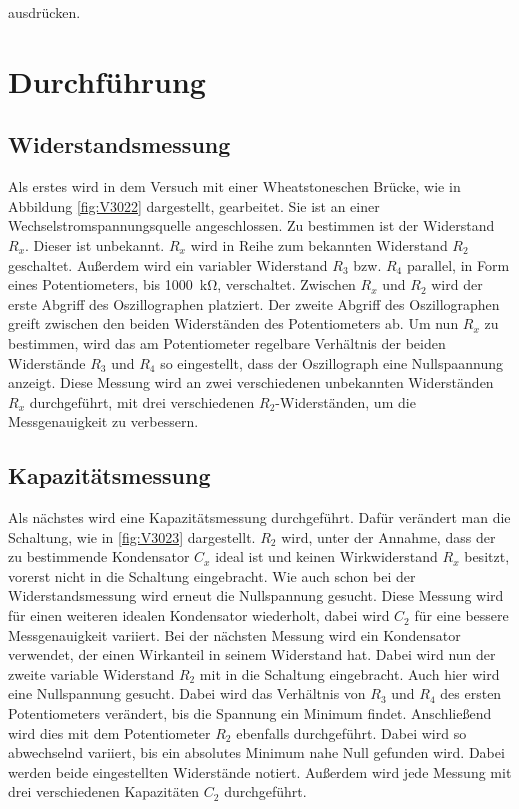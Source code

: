 \documentclass[
  bibliography=totoc,     %
  captions=tableheading,  %
  titlepage=firstiscover, %
]{scrartcl}
\begin{document}
ausdrücken.
\newpage
\section{Durchführung}
\label{sec:durchführung}
\subsection{Widerstandsmessung}
Als erstes wird in dem Versuch mit einer Wheatstoneschen Brücke, wie in
Abbildung \ref{fig:V3022} dargestellt, gearbeitet. Sie ist an einer
Wechselstromspannungsquelle angeschlossen. Zu bestimmen ist der Widerstand $R_x$.
Dieser ist unbekannt. $R_x$ wird in Reihe zum bekannten Widerstand $R_2$
geschaltet. Außerdem wird ein variabler Widerstand $R_3$ bzw. $R_4$ parallel,
in Form eines Potentiometers, bis \SI{1000}{\kilo\ohm}, verschaltet. Zwischen
$R_x$ und $R_2$ wird der erste Abgriff des Oszillographen platziert. Der zweite
Abgriff des Oszillographen greift zwischen den beiden Widerständen des
Potentiometers ab. Um nun $R_x$ zu bestimmen, wird das am Potentiometer
regelbare Verhältnis der beiden Widerstände $R_3$ und $R_4$ so eingestellt, dass
der Oszillograph eine Nullspaannung anzeigt. Diese Messung wird an zwei
verschiedenen unbekannten Widerständen $R_x$ durchgeführt, mit drei verschiedenen
$R_2$-Widerständen, um die Messgenauigkeit zu verbessern.
\subsection{Kapazitätsmessung}
Als nächstes wird eine Kapazitätsmessung durchgeführt. Dafür verändert man die
Schaltung, wie in \ref{fig:V3023} dargestellt. $R_2$ wird, unter der Annahme,
dass der zu bestimmende Kondensator $C_x$ ideal ist und keinen Wirkwiderstand
$R_x$ besitzt, vorerst nicht in die Schaltung eingebracht. Wie auch schon bei der
Widerstandsmessung wird erneut die Nullspannung gesucht. Diese Messung wird
für einen weiteren idealen Kondensator wiederholt, dabei wird $C_2$ für eine
bessere Messgenauigkeit variiert. Bei der nächsten Messung wird ein Kondensator
verwendet, der einen Wirkanteil in seinem Widerstand hat. Dabei wird nun der
zweite variable Widerstand $R_2$ mit in die Schaltung eingebracht. Auch hier
wird eine Nullspannung gesucht. Dabei wird das Verhältnis von $R_3$ und $R_4$
des ersten Potentiometers verändert, bis die Spannung ein Minimum findet.
Anschließend wird dies mit dem Potentiometer $R_2$ ebenfalls durchgeführt.
Dabei wird so abwechselnd variiert, bis ein absolutes Minimum nahe Null gefunden
wird. Dabei werden beide eingestellten Widerstände notiert. Außerdem wird jede
Messung mit drei verschiedenen Kapazitäten $C_2$ durchgeführt.
\newpage
\end{document}
